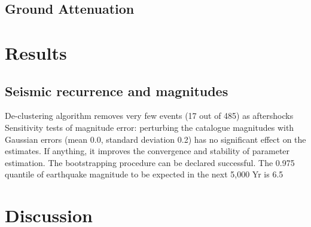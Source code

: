 \documentclass{report}
\begin{document}
\section{Ground Attenuation}

\chapter{Results}
\section{Seismic recurrence and magnitudes}

De-clustering algorithm removes very few events (17 out of 485)
as aftershocks Sensitivity tests of magnitude error: perturbing
the catalogue magnitudes with Gaussian errors (mean 0.0, standard
deviation 0.2) has no significant effect on the estimates. If
anything, it improves the convergence and stability of parameter
estimation. The bootstrapping procedure can be declared
successful.  The 0.975 quantile of earthquake magnitude to be
expected in the next 5,000 Yr is 6.5 

\chapter{Discussion}



\end{document}

